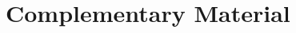 \documentclass[handout,10pt]{beamer}
\begin{document}
\appendix
\section{Complementary Material}
	










\end{document}
